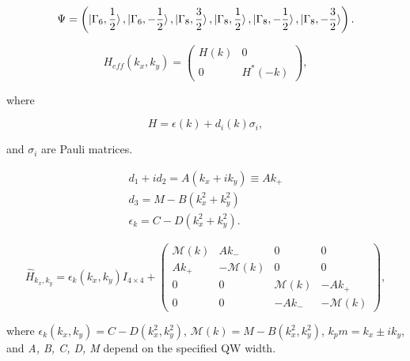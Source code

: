 \documentclass[titlepage,a4paper]{book}
\begin{document}
\begin{equation}
\label{1}
\Psi = \left( \ket{\Gamma_6, \frac{1}{2}}, \ket{\Gamma_6, -\frac{1}{2}}, \ket{\Gamma_8, \frac{3}{2}}, \ket{\Gamma_8, \frac{1}{2}}, \ket{\Gamma_8, -\frac{1}{2}}, \ket{\Gamma_8, -\frac{3}{2}}  \right).
\end{equation}


\begin{equation}
\label{2}
H_{eff}(k_x, k_y) =  \left( \begin{array}{cc}
H(k) & 0 \\
0 & H^*(-k) \end{array} \right),
\end{equation}

where 

\begin{equation}
\label{3}
H = \epsilon (k) + d_i (k) \sigma_i,
\end{equation}

and $\sigma_i$ are Pauli matrices.

\begin{equation}
\begin{aligned}
\label{4}
d_1 + id_2 = A(k_x + ik_y) \equiv Ak_+ \\
d_3 = M - B(k_x^2 + k_y^2) \\
\epsilon_k = C - D(k_x^2 + k_y^2).
\end{aligned}
\end{equation}

\begin{equation}
\label{asd}
\hat{H}_{k_x, k_y} = \epsilon_k(k_x, k_y) I_{4 \times 4} + \left( \begin{array}{cccc}
\mathcal{M}(k) & Ak_- & 0 & 0 \\
Ak_+ & -\mathcal{M}(k) & 0 & 0 \\
0 & 0 & \mathcal{M}(k) & -Ak_+ \\
0 & 0 & -Ak_- & -\mathcal{M}(k) \end{array} \right),
\end{equation}

where $\epsilon_k(k_x, k_y) = C - D(k_x^2, k_y^2)$, $\mathcal{M}(k) = M - B(k_x^2, k_y^2)$, $k_pm = k_x \pm ik_y$, and \textit{A, B, C, D, M} depend on the specified QW width.

\end{document}
